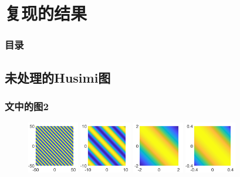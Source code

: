 \documentclass[UTF8]{beamer}
\begin{document}
\section{复现的结果}
\begin{frame}\frametitle{目录}
	\tableofcontents[currentsection]
\end{frame}
\subsection{未处理的Husimi图}

\begin{frame}
	\frametitle{文中\cite{mason2013quantum}的图2}
	\begin{figure}
		\centering
		\includegraphics[width = 0.2\textwidth]{../images/figure/PsiA2.png}
		\quad
		\includegraphics[width = 0.2\textwidth]{../images/figure/PsiA10.png}
		\quad
		\includegraphics[width = 0.2\textwidth]{../images/figure/PsiA50.png}
		\quad
		\includegraphics[width = 0.2\textwidth]{../images/figure/PsiA250.png}
\end{figure}
\end{frame}
\end{document}
